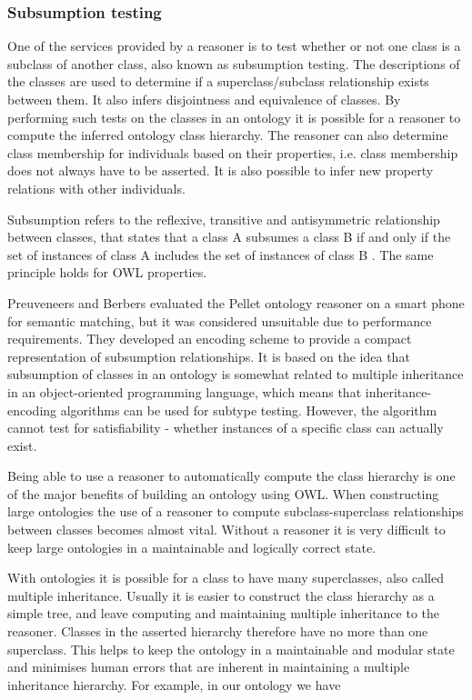 \subsubsection{Subsumption testing}

One of the services provided by a reasoner is to test whether or not one class is a subclass of another class, also known as subsumption testing. The descriptions of the classes are used to determine if a superclass/subclass relationship exists between them. It also infers disjointness and equivalence of classes. By performing such tests on the classes in an ontology it is possible for a reasoner to compute the inferred ontology class hierarchy. The reasoner can also determine class membership for individuals based on their properties, i.e. class membership does not always have to be asserted. It is also possible to infer new property relations with other individuals.

Subsumption refers to the reflexive, transitive and antisymmetric relationship between classes, that states that a class A subsumes a class B if and only if the set of instances of class A includes the set of instances of class B \cite{Preuveneers2008}. The same principle holds for \ac{OWL} properties.

Preuveneers and Berbers \cite{Preuveneers2008} evaluated the Pellet ontology reasoner on a smart phone for semantic matching, but it was considered unsuitable due to performance requirements. They developed an encoding scheme to provide a compact representation of subsumption relationships. It is based on the idea that subsumption of classes in an ontology is somewhat related to multiple inheritance in an object-oriented programming language, which means that in\-heritance-en\-coding algorithms can be used for subtype testing. However, the algorithm cannot test for satisfiability - whether instances of a specific class can actually exist. 

Being able to use a reasoner to automatically compute the class hierarchy is one of the major benefits of building an ontology using \ac{OWL}. When constructing large ontologies the use of a reasoner to compute subclass-superclass relationships between classes becomes almost vital. Without a reasoner it is very difficult to keep large ontologies in a maintainable and logically correct state. 

With ontologies it is possible for a class to have many superclasses, also called multiple inheritance. Usually it is easier to construct the class hierarchy as a simple tree, and leave computing and maintaining multiple inheritance to the reasoner. Classes in the asserted hierarchy therefore have no more than one superclass. This helps to keep the ontology in a maintainable and modular state and minimises human errors that are inherent in maintaining a multiple inheritance hierarchy. For example, in our ontology we have 

